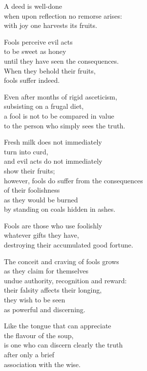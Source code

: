 A deed is well-done\\
when upon reflection no remorse arises:\\
with joy one harvests its fruits.


Fools perceive evil acts\\
to be sweet as honey\\
until they have seen the consequences.\\
When they behold their fruits,\\
fools suffer indeed.


Even after months of rigid asceticism,\\
subsisting on a frugal diet,\\
a fool is not to be compared in value\\
to the person who simply sees the truth.


Fresh milk does not immediately\\
turn into curd,\\
and evil acts do not immediately\\
show their fruits;\\
however, fools do suffer from the consequences\\
of their foolishness\\
as they would be burned\\
by standing on coals hidden in ashes.


Fools are those who use foolishly\\
whatever gifts they have,\\
destroying their accumulated good fortune.


The conceit and craving of fools grows\\
as they claim for themselves\\
undue authority, recognition and reward:\\
their falsity affects their longing,\\
they wish to be seen\\
as powerful and discerning.



Like the tongue that can appreciate\\
the flavour of the soup,\\
is one who can discern clearly the truth\\
after only a brief\\
association with the wise.

